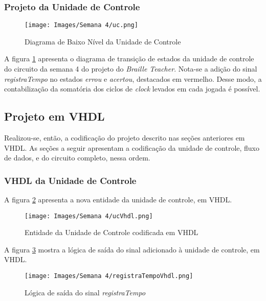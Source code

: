 \documentclass[amsmath,amssymb,floatfix]{report}
\begin{document}
\subsubsection{Projeto da Unidade de Controle}
\label{subsubsec:uc4}

\begin{figure}[H]
    \centering
    \texttt{[image: Images/Semana 4/uc.png]}
    \caption{Diagrama de Baixo Nível da Unidade de Controle}
    \label{fig:uc4}
\end{figure}

A figura \ref{fig:uc4} apresenta o diagrama de transição de estados da unidade de controle do circuito da semana 4 do projeto do \textit{Braille Teacher}. Nota-se a adição do sinal \textit{registraTempo} no estados \textit{errou} e \textit{acertou}, destacados em vermelho. Desse modo, a contabilização da somatória dos ciclos de \textit{clock} levados em cada jogada é possível.


\subsection{Projeto em VHDL}
\label{subsec:projetoVhdl4}

Realizou-se, então, a codificação do projeto descrito nas seções anteriores em VHDL. As seções a seguir apresentam a codificação da unidade de controle, fluxo de dados, e do circuito completo, nessa ordem.

\subsubsection{VHDL da Unidade de Controle}
\label{subsubsec:ucVhdl4}

A figura \ref{fig:ucVhdl4} apresenta a nova entidade da unidade de controle, em VHDL.

\begin{figure}[H]
    \centering
    \texttt{[image: Images/Semana 4/ucVhdl.png]}
    \caption{Entidade da Unidade de Controle codificada em VHDL}
    \label{fig:ucVhdl4}
\end{figure}

A figura \ref{fig:registraTempo} mostra a lógica de saída do sinal adicionado à unidade de controle, em VHDL.

\begin{figure}[H]
    \centering
    \texttt{[image: Images/Semana 4/registraTempoVhdl.png]}
    \caption{Lógica de saída do sinal \textit{registraTempo}}
    \label{fig:registraTempo}
\end{figure}
\end{document}
